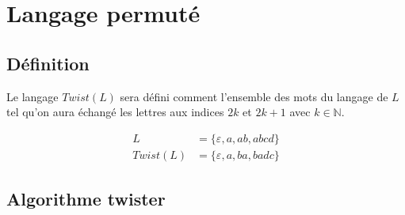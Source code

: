 \section{Langage permuté}

\subsection{Définition}


\begin{frame}{\myframetitle}
  \begin{definition}[\(Twist(L)\)]
    Le langage \(Twist(L)\) sera défini comment l'ensemble des mots du
    langage de \(L\) tel qu'on aura échangé les lettres aux indices \(2k\) et
    \(2k + 1\) avec \(k\in \mathbb{N}\).
  \end{definition}

  \pause[]

  \begin{example}
    \vspace*{-\baselineskip}
    \begin{align*}
      L &= \{\varepsilon, a, ab, abcd\} \\
      Twist(L) &= \{\varepsilon, a, ba, badc\}
    \end{align*}
  \end{example}
\end{frame}

\subsection{Algorithme twister}


